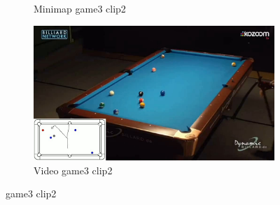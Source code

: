 \begin{figure}[H]
\begin{subfigure}[b]{0.48\textwidth}
    	\caption{Minimap game3 clip2}
    	\label{fig: game3_clip2_minimap}
    \end{subfigure}
    \begin{subfigure}[b]{0.48\textwidth}
    	\centering
    	\includegraphics[width=\textwidth]{images/Video/game3_clip2_video.jpg}
    	\caption{Video game3 clip2}
    	\label{fig: game3_clip2_video}
    \end{subfigure}

	\caption{game3 clip2}
\end{figure}

